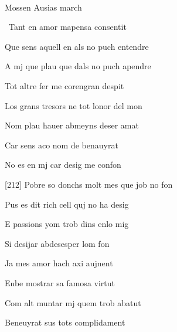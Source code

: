 \documentclass[12pt]{article}
\renewcommand{\espaiAbansEtiquetaPoema}{\vspace{0ex}}
\begin{document}
\begin{estrofa}

\espaiAbansEtiquetaPoema

\\

\begin{rubrica}

\textsection{} Mossen Ausias march \textsection{}

\end{rubrica}

\end{estrofa}


\begin{estrofa}

 \textparagraph\  Tant en amor mapensa consentit

 Que sens aquell en als no puch entendre

 A mj que plau que dals no puch apendre

 Tot altre fer me corengran despit

 Los grans tresors ne tot lonor del mon

 Nom plau hauer abmeyns deser amat

 Car sens aco nom de benauyrat

 No es en mj car desig me confon

\end{estrofa}



\begin{estrofa}

 [212] Pobre so donchs molt mes que job no fon

 Pus es dit rich cell quj no ha desig

 E passions yom trob dins enlo mig

 Si desijar abdesesper lom fon

 Ja mes amor hach axi aujnent

 Enbe mostrar sa famosa virtut

 Com alt muntar mj quem trob abatut

 Beneuyrat sus tots complidament

\end{estrofa}
\end{document}
